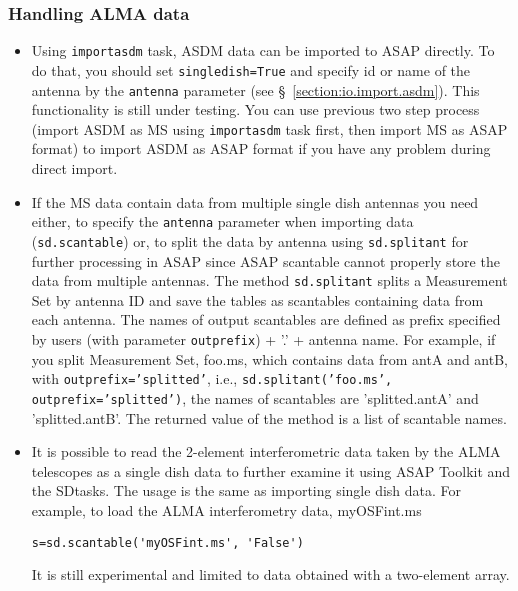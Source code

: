 \subsubsection{Handling ALMA data}

\begin{itemize}
\item Using {\tt importasdm} task, ASDM data can be imported to ASAP directly.
To do that, you should set {\tt singledish=True} and specify id or name of 
the antenna by the {\tt antenna} parameter 
(see \S~\ref{section:io.import.asdm}). This functionality is still under 
testing. You can use previous two step process (import ASDM as MS using 
{\tt importasdm} task first, then import MS as ASAP format) to import ASDM 
as ASAP format if you have any problem during direct import. 

\item If the MS data contain data from multiple single dish antennas you need either, to 
specify the {\tt antenna} parameter when importing data ({\tt sd.scantable}) or,
 to split the data by antenna using {\tt sd.splitant} for further processing in ASAP 
since ASAP scantable cannot properly store the data from multiple antennas.
The method {\tt sd.splitant} splits a Measurement Set by antenna ID
and save the tables as scantables containing data from each antenna. 
The names of output scantables are defined as prefix specified by
users (with parameter {\tt outprefix}) + '.' + antenna name. For
example, if you split Measurement Set, foo.ms, which contains data
from antA and antB, with {\tt outprefix='splitted'}, i.e., 
{\tt sd.splitant('foo.ms', outprefix='splitted')}, the names of scantables
are 'splitted.antA' and 'splitted.antB'.  
The returned value of the method is a list of scantable names. 

\item It is possible to read the 2-element interferometric
data taken by the ALMA telescopes 
as a single dish data to further examine it using ASAP Toolkit and
the SDtasks. The usage is the same as importing single
dish data. 
For example, to load the ALMA interferometry data, myOSFint.ms
\begin{verbatim} 
s=sd.scantable('myOSFint.ms', 'False')
\end{verbatim} 
It is still experimental and limited to data obtained with a
two-element array.


\end{itemize}
